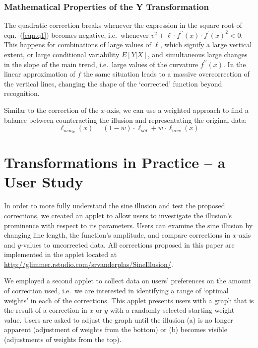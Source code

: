 \documentclass[11pt]{isuthesis}\usepackage[]{graphicx}\usepackage[]{color}
\begin{document}
\subsubsection{Mathematical Properties of the Y Transformation}
The quadratic correction breaks whenever the expression in the square root of eqn.~(\ref{eqn.q1}) becomes negative, i.e.~whenever $v^2 \pm \ell\cdot f^{\prime\prime}(x)\cdot f^\prime(x)^2 < 0$.
This happens for  combinations of large values of $\ell$, which signify a large vertical extent, or large conditional variability $E[Y|X]$, and simultaneous large changes in the slope of the main trend, i.e.~large values of the curvature $f^{\prime\prime}(x)$. In the linear approximation of $f$ the same situation leads to a massive overcorrection of the vertical lines, changing the shape of the `corrected' function beyond recognition.

Similar to the correction of the $x$-axis,  we can use a weighted approach to find a balance between counteracting the illusion and representating the  original data:
\begin{equation}\label{eqn.ytrans.weighted}
\ell_{new_w}(x) = (1-w) \cdot \ell_{old} + w \cdot \ell_{new}(x)
\end{equation}

\section{Transformations in Practice -- a User Study}

In order to more fully understand the sine illusion and test the proposed corrections, we created an applet to allow users to investigate the illusion's prominence with respect to its parameters. Users can examine the sine illusion by changing line length, the function's amplitude, and compare corrections in $x$-axis and $y$-values to uncorrected data.  All corrections proposed in this paper are  implemented in the applet located at \url{http://glimmer.rstudio.com/srvanderplas/SineIllusion/}.

We employed a second applet to collect data on users' preferences on the amount of correction used, i.e.~we are interested in identifying a range of `optimal weights' in each of the corrections. This applet presents users with a graph that is the result of a correction in $x$ or $y$ with a randomly selected starting weight value. Users are asked to adjust the graph until the illusion  (a) is no longer apparent (adjustment of weights from the bottom) or (b) becomes visible (adjustments of weights from the top).
\end{document}
